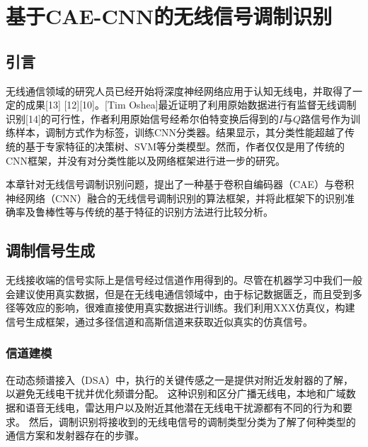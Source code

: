 \chapter{基于CAE-CNN的无线信号调制识别}

\section{引言}

无线通信领域的研究人员已经开始将深度神经网络应用于认知无线电，并取得了一定的成果[13] [12][10]。[Tim Oshea]最近证明了利用原始数据进行有监督无线调制识别[14]的可行性，作者利用原始信号经希尔伯特变换后得到的$I$与$Q$路信号作为训练样本，调制方式作为标签，训练CNN分类器。结果显示，其分类性能超越了传统的基于专家特征的决策树、SVM等分类模型。然而，作者仅仅是用了传统的CNN框架，并没有对分类性能以及网络框架进行进一步的研究。\par

本章针对无线信号调制识别问题，提出了一种基于卷积自编码器（CAE）与卷积神经网络（CNN）融合的无线信号调制识别的算法框架，并将此框架下的识别准确率及鲁棒性等与传统的基于特征的识别方法进行比较分析。\par


\section{调制信号生成}

无线接收端的信号实际上是信号经过信道作用得到的。尽管在机器学习中我们一般会建议使用真实数据，但是在无线电通信领域中，由于标记数据匮乏，而且受到多径等效应的影响，很难直接使用真实数据进行训练。我们利用XXX仿真仪，构建信号生成框架，通过多径信道和高斯信道来获取近似真实的仿真信号。\par


\subsection{信道建模}

在动态频谱接入（DSA）中，执行的关键传感之一是提供对附近发射器的了解，以避免无线电干扰并优化频谱分配。 这种识别和区分广播无线电，本地和广域数据和语音无线电，雷达用户以及附近其他潜在无线电干扰源都有不同的行为和要求。 然后，调制识别将接收到的无线电信号的调制类型分类为了解了何种类型的通信方案和发射器存在的步骤。


